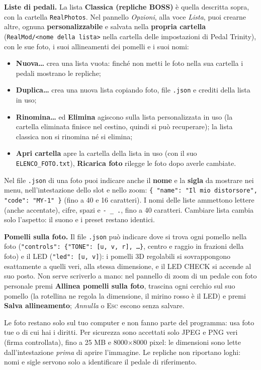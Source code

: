 \documentclass[11pt,a4paper]{article}
\begin{document}
\textbf{Liste di pedali.} La lista \textbf{Classica (repliche BOSS)} è quella descritta sopra, con la
cartella \texttt{RealPhotos}. Nel pannello \emph{Opzioni}, alla voce \emph{Lista}, puoi crearne altre,
ognuna \textbf{personalizzabile} e salvata nella \textbf{propria cartella} (\texttt{RealMod/<nome della lista>}
nella cartella delle impostazioni di Pedal Trinity), con le sue foto, i suoi allineamenti dei pomelli
e i suoi nomi:
\begin{itemize}
  \item \textbf{Nuova\dots} crea una lista vuota: finché non metti le foto nella sua cartella i pedali
        mostrano le repliche;
  \item \textbf{Duplica\dots} crea una nuova lista copiando foto, file \texttt{.json} e crediti della lista in uso;
  \item \textbf{Rinomina\dots} ed \textbf{Elimina} agiscono sulla lista personalizzata in uso (la cartella
        eliminata finisce nel cestino, quindi si può recuperare); la lista classica non si rinomina né si elimina;
  \item \textbf{Apri cartella} apre la cartella della lista in uso (con il suo \texttt{ELENCO\_FOTO.txt}),
        \textbf{Ricarica foto} rilegge le foto dopo averle cambiate.
\end{itemize}
Nel file \texttt{.json} di una foto puoi indicare anche il \textbf{nome} e la \textbf{sigla} da mostrare nei
menu, nell'intestazione dello slot e nello zoom: \texttt{\{ "name": "Il mio distorsore", "code": "MY-1" \}}
(fino a 40 e 16 caratteri). I nomi delle liste ammettono lettere (anche accentate), cifre, spazi e
\texttt{- \_ .}, fino a 40 caratteri. Cambiare lista cambia solo l'aspetto: il suono e i preset restano identici.

\textbf{Pomelli sulla foto.} Il file \texttt{.json} può indicare dove si trova ogni pomello nella foto
(\texttt{"controls": \{"TONE": [u, v, r], \dots\}}, centro e raggio in frazioni della foto) e il LED
(\texttt{"led": [u, v]}): i pomelli 3D regolabili si sovrappongono esattamente a quelli veri, alla stessa
dimensione, e il LED CHECK si accende al suo posto. Non serve scriverlo a mano: nel pannello di zoom
di un pedale con foto personale premi \textbf{Allinea pomelli sulla foto}, trascina ogni cerchio sul
suo pomello (la rotellina ne regola la dimensione, il mirino rosso è il LED) e premi \textbf{Salva
allineamento}; \emph{Annulla} o \textsc{Esc} escono senza salvare.
\begin{avviso}
Le foto restano solo sul tuo computer e non fanno parte del programma: usa foto tue o di cui hai i
diritti. Per sicurezza sono accettati solo JPEG e PNG veri (firma controllata), fino a 25 MB e
8000$\times$8000 pixel: le dimensioni sono lette dall'intestazione \emph{prima} di aprire l'immagine.
Le repliche non riportano loghi: nomi e sigle servono solo a identificare il pedale di riferimento.
\end{avviso}
\end{document}
